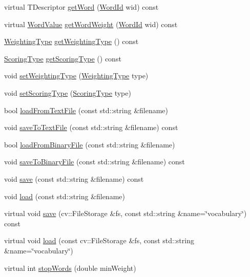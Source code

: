 \begin{DoxyCompactItemize}
\item 
virtual T\-Descriptor \hyperlink{classDBoW2_1_1TemplatedVocabulary_aed50a053fac7e270bf8369a8667cf2c6}{get\-Word} (\hyperlink{namespaceDBoW2_ab1a0d3283b2d4690a383372ed20bfeb5}{Word\-Id} wid) const 
\item 
virtual \hyperlink{namespaceDBoW2_a55fcd7333e591a38e96b91f41bc182f6}{Word\-Value} \hyperlink{classDBoW2_1_1TemplatedVocabulary_a95edc3ffa594ac7a798aec0808997b4a}{get\-Word\-Weight} (\hyperlink{namespaceDBoW2_ab1a0d3283b2d4690a383372ed20bfeb5}{Word\-Id} wid) const 
\item 
\hyperlink{namespaceDBoW2_a5de5c8a307aca9a84ffefda2a9bc467a}{Weighting\-Type} \hyperlink{classDBoW2_1_1TemplatedVocabulary_aa1b7c6f984353736ecf4a2483b1c1b6b}{get\-Weighting\-Type} () const 
\item 
\hyperlink{namespaceDBoW2_aa252a592dd607c6e60dede06ceef2722}{Scoring\-Type} \hyperlink{classDBoW2_1_1TemplatedVocabulary_adca2e844333011cd9341d42be9cec5e3}{get\-Scoring\-Type} () const 
\item 
void \hyperlink{classDBoW2_1_1TemplatedVocabulary_aa8f63a3379debd40214899d996cfc733}{set\-Weighting\-Type} (\hyperlink{namespaceDBoW2_a5de5c8a307aca9a84ffefda2a9bc467a}{Weighting\-Type} type)
\item 
void \hyperlink{classDBoW2_1_1TemplatedVocabulary_a05a6c2f46184618c9ea8368f53e6980c}{set\-Scoring\-Type} (\hyperlink{namespaceDBoW2_aa252a592dd607c6e60dede06ceef2722}{Scoring\-Type} type)
\item 
bool \hyperlink{classDBoW2_1_1TemplatedVocabulary_a5447d0744100254c4da88ea039fb3414}{load\-From\-Text\-File} (const std\-::string \&filename)
\item 
void \hyperlink{classDBoW2_1_1TemplatedVocabulary_a8856121ae0d46ed08db95e51ba74e6eb}{save\-To\-Text\-File} (const std\-::string \&filename) const 
\item 
bool \hyperlink{classDBoW2_1_1TemplatedVocabulary_aa8c05732a3c2a063b0a8c1cbc418597a}{load\-From\-Binary\-File} (const std\-::string \&filename)
\item 
void \hyperlink{classDBoW2_1_1TemplatedVocabulary_a54f4d76e7ebe4a3a5ead07dabe9c6688}{save\-To\-Binary\-File} (const std\-::string \&filename) const 
\item 
void \hyperlink{classDBoW2_1_1TemplatedVocabulary_af85fb30a5eb9e00ceeea9a4f3c178f1d}{save} (const std\-::string \&filename) const 
\item 
void \hyperlink{classDBoW2_1_1TemplatedVocabulary_afdec2031c98b9109451b1454f73348b0}{load} (const std\-::string \&filename)
\item 
virtual void \hyperlink{classDBoW2_1_1TemplatedVocabulary_a19159c3993fce7b4573a6de208b4a973}{save} (cv\-::\-File\-Storage \&fs, const std\-::string \&name=\char`\"{}vocabulary\char`\"{}) const 
\item 
virtual void \hyperlink{classDBoW2_1_1TemplatedVocabulary_a037ba240314ff30f3620fb4de6845c66}{load} (const cv\-::\-File\-Storage \&fs, const std\-::string \&name=\char`\"{}vocabulary\char`\"{})
\item 
virtual int \hyperlink{classDBoW2_1_1TemplatedVocabulary_a0b6721fde54bd8cd008f6a120398741e}{stop\-Words} (double min\-Weight)
\end{DoxyCompactItemize}

